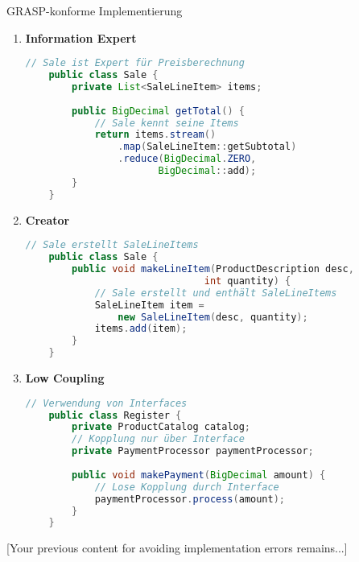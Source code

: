 \begin{KR}{GRASP-konforme Implementierung}
\begin{enumerate}
    \item \textbf{Information Expert}
    \begin{lstlisting}[language=Java]
    // Sale ist Expert für Preisberechnung
    public class Sale {
        private List<SaleLineItem> items;
        
        public BigDecimal getTotal() {
            // Sale kennt seine Items
            return items.stream()
                .map(SaleLineItem::getSubtotal)
                .reduce(BigDecimal.ZERO, 
                       BigDecimal::add);
        }
    }
    \end{lstlisting}

    \item \textbf{Creator}
    \begin{lstlisting}[language=Java]
    // Sale erstellt SaleLineItems
    public class Sale {
        public void makeLineItem(ProductDescription desc, 
                               int quantity) {
            // Sale erstellt und enthält SaleLineItems
            SaleLineItem item = 
                new SaleLineItem(desc, quantity);
            items.add(item);
        }
    }
    \end{lstlisting}

    \item \textbf{Low Coupling}
    \begin{lstlisting}[language=Java]
    // Verwendung von Interfaces
    public class Register {
        private ProductCatalog catalog;
        // Kopplung nur über Interface
        private PaymentProcessor paymentProcessor;
        
        public void makePayment(BigDecimal amount) {
            // Lose Kopplung durch Interface
            paymentProcessor.process(amount);
        }
    }
    \end{lstlisting}
\end{enumerate}
\end{KR}

[Your previous content for avoiding implementation errors remains...]